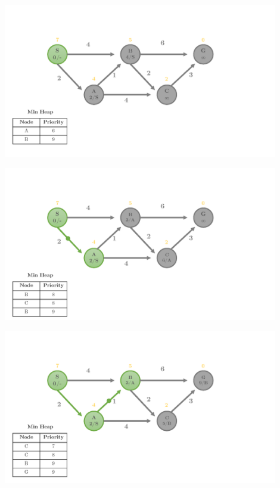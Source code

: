 \documentclass[12pt]{article}
\begin{document}
\begin{center}
  \includegraphics[width=0.9\textwidth]{heuristic2_Page2.png}
\end{center}

\begin{center}
  \includegraphics[width=0.9\textwidth]{heuristic2_Page3.png}
\end{center}

\begin{center}
  \includegraphics[width=0.9\textwidth]{heuristic2_Page4.png}
\end{center}
\end{document}
